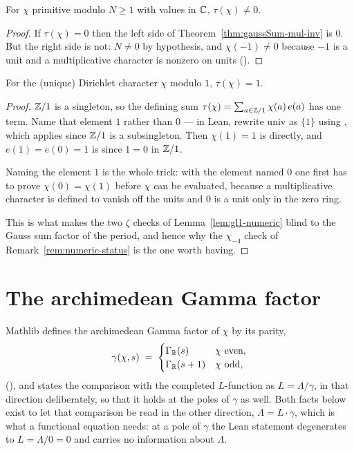 \begin{corollary}
  \label{cor:gaussSum-ne-zero}
  \leanok
  For $\chi$ primitive modulo $N \geq 1$ with values in $\mathbb{C}$, $\tau(\chi) \neq 0$.
\end{corollary}
\begin{proof}
  \leanok
  If $\tau(\chi) = 0$ then the left side of Theorem~\ref{thm:gaussSum-mul-inv} is $0$. But
  the right side is not: $N \neq 0$ by hypothesis, and $\chi(-1) \neq 0$ because $-1$ is a
  unit and a multiplicative character is nonzero on units
  ().
\end{proof}

\begin{lemma}
  \label{lem:gaussSum-modOne}
  \leanok
  For the (unique) Dirichlet character $\chi$ modulo $1$, $\tau(\chi) = 1$.
\end{lemma}
\begin{proof}
  \leanok
  $\mathbb{Z}/1$ is a singleton, so the defining sum
  $\tau(\chi) = \sum_{a \in \mathbb{Z}/1} \chi(a)\, e(a)$ has one term. Name that element $1$
  rather than $0$ --- in Lean, rewrite $\mathrm{univ}$ as $\{1\}$ using
  , which applies since $\mathbb{Z}/1$ is a subsingleton. Then
  $\chi(1) = 1$ is  directly, and $e(1) = e(0) = 1$ is
   since $1 = 0$ in $\mathbb{Z}/1$.

  Naming the element $1$ is the whole trick: with the element named $0$ one first has to
  prove $\chi(0) = \chi(1)$ before $\chi$ can be evaluated, because a multiplicative
  character is defined to vanish off the units and $0$ is a unit only in the zero ring.

  This is what makes the two $\zeta$ checks of Lemma~\ref{lem:gl1-numeric} blind to the
  Gauss sum factor of the period, and hence why the $\chi_{-4}$ check of
  Remark~\ref{rem:numeric-status} is the one worth having.
\end{proof}

\section{The archimedean Gamma factor}
\label{sec:dirichlet-gammaFactor}

Mathlib defines the archimedean Gamma factor of $\chi$ by its parity,
\[ \gamma(\chi, s) \;=\; \begin{cases}
     \Gamma_{\mathbb{R}}(s) & \chi \text{ even},\\
     \Gamma_{\mathbb{R}}(s+1) & \chi \text{ odd},
   \end{cases} \]
(), and states the comparison with the completed
$L$-function as $L = \Lambda/\gamma$, in that direction deliberately, so that it holds at the
poles of $\gamma$ as well. Both facts below exist to let that comparison be read in the other
direction, $\Lambda = L \cdot \gamma$, which is what a functional equation needs: at a pole of
$\gamma$ the Lean statement degenerates to $L = \Lambda/0 = 0$ and carries no information
about $\Lambda$.

